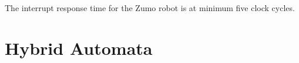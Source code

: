 \documentclass[12pt]{article}
\begin{document}
The interrupt response time for the Zumo robot is at minimum five clock cycles.

%
%
%


\newpage
\section*{Hybrid Automata}
\end{document}
